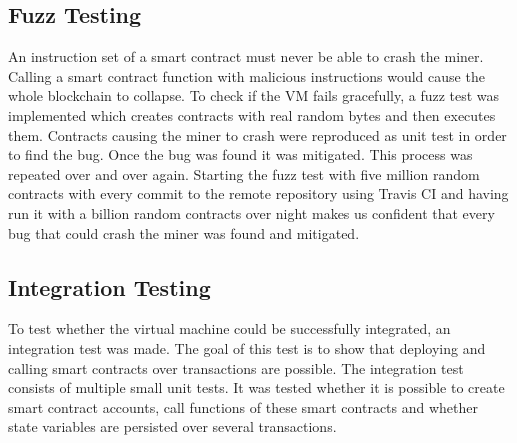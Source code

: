 \subsection{Fuzz Testing} \label{fuzz_testing}
An instruction set of a smart contract must never be able to crash the miner. Calling a smart contract function with malicious instructions would cause the whole blockchain to collapse. To check if the VM fails gracefully, a fuzz test was implemented which creates contracts with real random bytes and then executes them. Contracts causing the miner to crash were reproduced as unit test in order to find the bug. Once the bug was found it was mitigated. This process was repeated over and over again. Starting the fuzz test with five million random contracts with every commit to the remote repository using Travis CI and having run it with a billion random contracts over night makes us confident that every bug that could crash the miner was found and mitigated. 

\subsection{Integration Testing}
To test whether the virtual machine could be successfully integrated, an integration test was made. The goal of this test is to show that deploying and calling smart contracts over transactions are possible. The integration test consists of multiple small unit tests. It was tested whether it is possible to create smart contract accounts, call functions of these smart contracts and whether state variables are persisted over several transactions.
